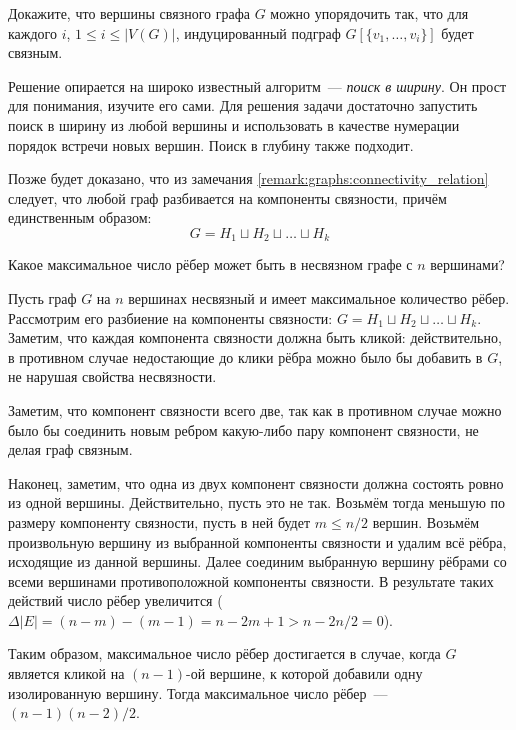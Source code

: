 \begin{Exercise}[counter=SecExercise, label={exercise:graphs:BFS_sort}]
    \noindent
    Докажите, что вершины связного графа $ G $ можно упорядочить так,
    что для каждого $ i $, $ 1 \leqslant i \leqslant |V(G)| $,
    индуцированный подграф $ G[\{v_1, \ldots, v_i \}] $ будет связным.
\end{Exercise}

\begin{Answer}
    \noindent
    Решение опирается на широко известный алгоритм~--- \emph{поиск в ширину}.
    Он прост для понимания, изучите его сами.
    Для решения задачи достаточно запустить поиск в ширину из любой вершины
    и использовать в качестве нумерации порядок встречи новых вершин.
    Поиск в глубину также подходит.
\end{Answer}


\begin{remark}
    \label{remark:graphs:cc_partition}
    Позже будет доказано, что из замечания \ref{remark:graphs:connectivity_relation} следует, что любой граф разбивается на компоненты связности, причём единственным образом:
    \[
        G = H_1 \sqcup H_2 \sqcup \ldots \sqcup H_k
    \]
\end{remark}


\begin{Exercise}[counter=SecExercise, label={exercise:graphs:max_edges_in_disconnected_graph}]
    \noindent
    Какое максимальное число рёбер может быть в несвязном графе с $ n $ вершинами?
\end{Exercise}

\begin{Answer}
    \noindent
    Пусть граф $ G $ на $ n $ вершинах несвязный и имеет максимальное количество рёбер.
    Рассмотрим его разбиение на компоненты связности: $ G = H_1 \sqcup H_2 \sqcup \ldots \sqcup H_k $.
    Заметим, что каждая компонента связности должна быть кликой:
    действительно, в противном случае недостающие до клики рёбра можно было бы добавить в $ G $,
    не нарушая свойства несвязности.

    Заметим, что компонент связности всего две,
    так как в противном случае можно было бы соединить новым ребром какую-либо пару компонент связности,
    не делая граф связным.

    Наконец, заметим, что одна из двух компонент связности должна состоять ровно из одной вершины.
    Действительно, пусть это не так.
    Возьмём тогда меньшую по размеру компоненту связности, пусть в ней будет $ m \leqslant n/2 $ вершин.
    Возьмём произвольную вершину из выбранной компоненты связности и удалим всё рёбра,
    исходящие из данной вершины.
    Далее соединим выбранную вершину рёбрами со всеми вершинами противоположной компоненты связности.
    В результате таких действий число рёбер увеличится ($ \Delta |E| = (n - m) - (m - 1) = n - 2 m + 1 > n - 2 n / 2 = 0 $).

    Таким образом, максимальное число рёбер достигается в случае, когда $ G $ является кликой на $ (n - 1) $-ой вершине,
    к которой добавили одну изолированную вершину.
    Тогда максимальное число рёбер~--- $ (n - 1)(n - 2) / 2 $.
\end{Answer}


